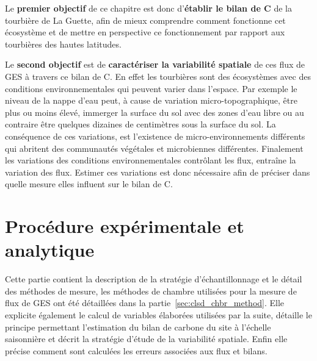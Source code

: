 Le \textbf{premier objectif} de ce chapitre est donc d'\textbf{établir le bilan de C} de la tourbière de La Guette, afin de mieux comprendre comment fonctionne cet écosystème et de mettre en perspective ce fonctionnement par rapport aux tourbières des hautes latitudes.

Le \textbf{second objectif} est de \textbf{caractériser la variabilité spatiale} de ces flux de GES à travers ce bilan de C.
En effet les tourbières sont des écosystèmes avec des conditions environnementales qui peuvent varier dans l'espace.
Par exemple le niveau de la nappe d'eau peut, à cause de variation micro-topographique, être plus ou moins élevé, immerger la surface du sol avec des zones d'eau libre ou au contraire être quelques dizaines de centimètres sous la surface du sol.
La conséquence de ces variations, est l'existence de micro-environnements différents qui abritent des communautés végétales et microbiennes différentes.
Finalement les variations des conditions environnementales contrôlant les flux, entraîne la variation des flux.
Estimer ces variations est donc nécessaire afin de préciser dans quelle mesure elles influent sur le bilan de C.

\section{Procédure expérimentale et analytique}

Cette partie contient la description de la stratégie d'échantillonnage et le détail des méthodes de mesure, les méthodes de chambre utilisées pour la mesure de flux de GES ont été détaillées dans la partie~\ref{sec:clsd_chbr_method}.
Elle explicite également le calcul de variables élaborées utilisées par la suite, détaille le principe permettant l'estimation du bilan de carbone du site à l'échelle saisonnière et décrit la stratégie d'étude de la variabilité spatiale.
Enfin elle précise comment sont calculées les erreurs associées aux flux et bilans.

